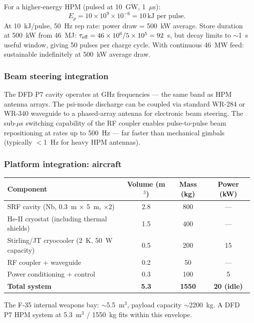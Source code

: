 \documentclass[11pt]{article}
\newcommand{\ee}[1]{\times 10^{#1}}
\begin{document}
For a higher-energy HPM (pulsed at 10~GW, 1~$\mu$s):
\begin{equation}
E_p = 10\ee{9} \times 10^{-6} = 10\,\text{kJ per pulse}.
\end{equation}
At 10~kJ/pulse, 50~Hz rep rate: power draw = 500~kW average.
Store duration at 500~kW from 46~MJ: $\tau_{\rm eff} = 46\ee{6}/5\ee{5}
= 92$~s, but decay limits to $\sim$1~s useful window, giving 50 pulses
per charge cycle. With continuous 46~MW feed: sustainable indefinitely
at 500~kW average draw.

\subsubsection{Beam steering integration}

The DFD P7 cavity operates at GHz frequencies --- the same band as HPM
antenna arrays. The psi-mode discharge can be coupled via standard WR-284
or WR-340 waveguide to a phased-array antenna for electronic beam
steering. The sub-$\mu$s switching capability of the RF coupler enables
pulse-to-pulse beam repositioning at rates up to 500~Hz --- far faster
than mechanical gimbals (typically $<$1~Hz for heavy HPM antennas).

\subsubsection{Platform integration: aircraft}

\begin{center}
\begin{tabular}{lccc}
\toprule
Component & Volume (m$^3$) & Mass (kg) & Power (kW) \\
\midrule
SRF cavity (Nb, 0.3~m $\times$ 5~m, $\times$2) & 2.8 & 800 & --- \\
He-II cryostat (including thermal shields) & 1.5 & 400 & --- \\
Stirling/JT cryocooler (2~K, 50~W capacity) & 0.5 & 200 & 15 \\
RF coupler + waveguide & 0.2 & 50 & --- \\
Power conditioning + control & 0.3 & 100 & 5 \\
\midrule
\textbf{Total system} & \textbf{5.3} & \textbf{1550} & \textbf{20 (idle)} \\
\bottomrule
\end{tabular}
\end{center}

The F-35 internal weapons bay: $\sim$5.5~m$^3$, payload capacity
$\sim$2200~kg. A DFD P7 HPM system at 5.3~m$^3$ / 1550~kg fits
within this envelope.
\end{document}
